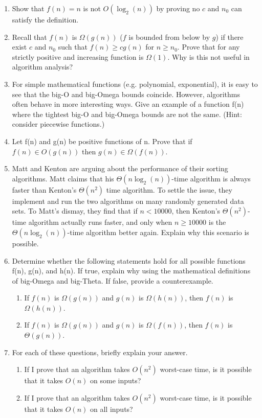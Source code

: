 \begin{enumerate}
  \item Show that $f(n) = n$ is not $O(\log_{2}(n))$ by proving no $c$ and $n_0$ can satisfy the definition.
  \item Recall that $f(n)$ is $\Omega(g(n))$ ($f$ is bounded from below by $g$) if there exist $c$ and $n_0$ such that $f(n) \ge cg(n)$ for $n \ge n_0$.
    Prove that for any strictly positive and increasing function is $\Omega(1)$. Why is this not useful in algorithm analysis?
  \item For simple mathematical functions (e.g. polynomial, exponential), it is easy to see that the big-O and big-Omega bounds coincide. However, algorithms often behave in more interesting ways.
    Give an example of a function f(n) where the tightest big-O and big-Omega bounds are not the same. (Hint: consider piecewise functions.)
  \item Let f(n) and g(n) be positive functions of n. Prove that if $f(n) \in O(g(n))$ then $g(n) \in \Omega(f(n))$.
  \item Matt and Kenton are arguing about the performance of their sorting algorithms. Matt claims that his $\Theta(n\log_{2}(n))$-time algorithm is always faster than Kenton’s $\Theta(n^2)$ time algorithm. To settle the issue, they implement and run the two algorithms on many randomly generated data sets. To Matt’s dismay, they find that if $n < 10000$, then Kenton’s $\Theta(n^{2})$-time algorithm actually runs faster, and only when $n \ge 10000$ is the $\Theta(n\log_{2}(n))$-time algorithm better again. Explain why this scenario is possible.
  \item Determine whether the following statements hold for all possible functions f(n), g(n), and h(n). If true, explain why using the mathematical definitions of big-Omega and big-Theta. If false, provide a counterexample.
    \begin{enumerate}
      \item If $f(n)$ is $\Omega(g(n))$ and $g(n)$ is $\Omega(h(n))$, then $f(n)$ is $\Omega(h(n))$.
      \item If $f(n)$ is $\Omega(g(n))$ and $g(n)$ is $\Omega(f(n))$, then $f(n)$ is $\Theta(g(n))$.
    \end{enumerate}
  \item For each of these questions, briefly explain your answer.
    \begin{enumerate}
      \item If I prove that an algorithm takes $O(n^2)$ worst-case time, is it possible that it takes $O(n)$ on some inputs?
      \item If I prove that an algorithm takes $O(n^2)$ worst-case time, is it possible that it takes $O(n)$ on all inputs?

\end{enumerate}
\end{enumerate}
